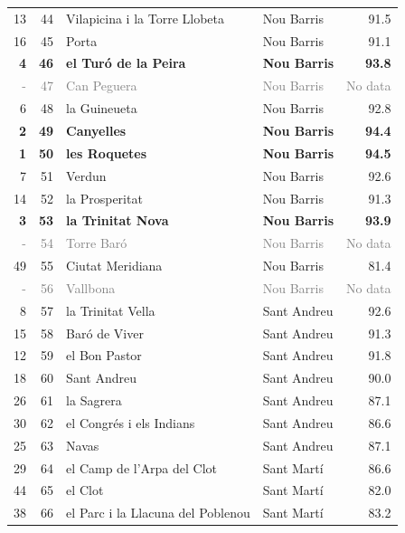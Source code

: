 {\begin{longtable}{rrllr}
          13 & 44 & Vilapicina i la Torre Llobeta & Nou Barris & 91.5 \\
          16 & 45 & Porta & Nou Barris & 91.1 \\
          \textbf{4} & \textbf{46} & \textbf{el Turó de la Peira} & \textbf{Nou Barris} & \textbf{93.8} \\
          \textcolor{gray}{-} & \textcolor{gray}{47} & \textcolor{gray}{Can Peguera} & \textcolor{gray}{Nou Barris} & \textcolor{gray}{No data} \\
          6 & 48 & la Guineueta & Nou Barris & 92.8 \\
          \textbf{2} & \textbf{49} & \textbf{Canyelles} & \textbf{Nou Barris} & \textbf{94.4} \\
          \textbf{1} & \textbf{50} & \textbf{les Roquetes} & \textbf{Nou Barris} & \textbf{94.5} \\
          7 & 51 & Verdun & Nou Barris & 92.6 \\
          14 & 52 & la Prosperitat & Nou Barris & 91.3 \\
          \textbf{3} & \textbf{53} & \textbf{la Trinitat Nova} & \textbf{Nou Barris} & \textbf{93.9} \\
          \textcolor{gray}{-} & \textcolor{gray}{54} & \textcolor{gray}{Torre Baró} & \textcolor{gray}{Nou Barris} & \textcolor{gray}{No data} \\
          49 & 55 & Ciutat Meridiana & Nou Barris & 81.4 \\
          \textcolor{gray}{-} & \textcolor{gray}{56} & \textcolor{gray}{Vallbona} & \textcolor{gray}{Nou Barris} & \textcolor{gray}{No data} \\
          8 & 57 & la Trinitat Vella & Sant Andreu & 92.6 \\
          15 & 58 & Baró de Viver & Sant Andreu & 91.3 \\
          12 & 59 & el Bon Pastor & Sant Andreu & 91.8 \\
          18 & 60 & Sant Andreu & Sant Andreu & 90.0 \\
          26 & 61 & la Sagrera & Sant Andreu & 87.1 \\
          30 & 62 & el Congrés i els Indians & Sant Andreu & 86.6 \\
          25 & 63 & Navas & Sant Andreu & 87.1 \\
          29 & 64 & el Camp de l'Arpa del Clot & Sant Martí & 86.6 \\
          44 & 65 & el Clot & Sant Martí & 82.0 \\
          38 & 66 & el Parc i la Llacuna del Poblenou & Sant Martí & 83.2 \\

\end{longtable}}
